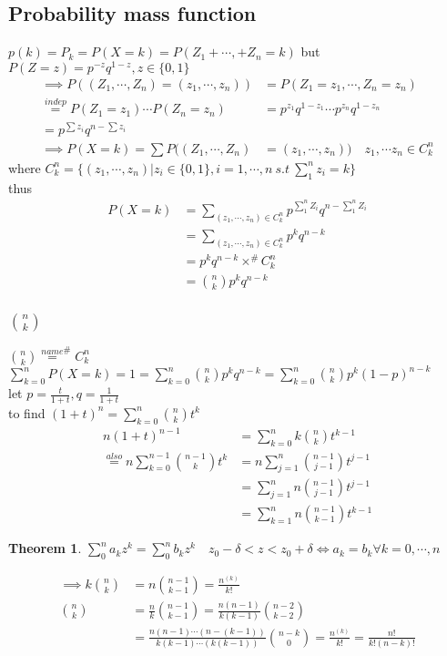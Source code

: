 \documentclass{article}
\theoremstyle{definition}
\theoremstyle{thrm}
\newtheorem{thrm}{Theorem}[section]
\theoremstyle{lma}
\theoremstyle{ppst}
\theoremstyle{crlr}
\begin{document}
\subsection{Probability mass function}
$ p(k) = P_k = P(X=k) = P(Z_1+\cdots,+Z_n=k)$ but $P(Z=z) = p^{-z}q^{1-z}, z\in \{0,1\}$
\begin{align*}
	\implies P((Z_1,\cdots,Z_n)=(z_1,\cdots,z_n)) &= P(Z_1=z_1,\cdots,Z_n=z_n)\\
	\stackrel{indep}{=}P(Z_1=z_1)\cdots P(Z_n=z_n) &= p^{z_1}q^{1-z_1}\cdots p^{z_n}q^{1-z_n}\\
	=p^{\sum z_i}q^{n-\sum z_i}\\
	\implies P(X=k) = \sum P((Z_1,\cdots,Z_n)&=(z_1,\cdots,z_n))\quad z_1,\cdots z_n\in C_k^n
\end{align*}
where $C_k^n = \{(z_1,\cdots, z_n)|z_i\in \{0,1\},i=1,\cdots,n\  s.t\ \sum_1^n z_i=k \}$\\
thus
\begin{align*}
	P(X=k) &=\sum_{(z_1,\cdots, z_n)\in C_k^n}p^{\sum_1^nZ_i}q^{n-\sum_1^nZ_i}\\
	&= \sum_{(z_1,\cdots, z_n)\in C_k^n} p^k q^{n-k}\\
	&= p^k q^{n-k}\times ^{\#}C_k^n\\
	&= {n \choose k}p^kq^{n-k}
\end{align*}
\subsubsection{$n\choose k$}
${n\choose k} \stackrel{name}{=}^{\#}C_k^n $\\
$\sum_{k=0}^nP(X=k)=1=\sum_{k=0}^n {n\choose k}p^kq^{n-k} =\sum_{k=0}^n {n\choose k}p^k(1-p)^{n-k}$\\
let $p = \frac{t}{1+t}, q=\frac{1}{1+t}$\\
to find $(1+t)^n = \sum_{k=0}^n{n\choose k}t^k$
\begin{align*}
	n(1+t)^{n-1} &= \sum_{k=0}^n	k{n \choose k}t^{k-1}\\
	\stackrel{also}{=}n\sum_{k=0}^{n-1}{n-1\choose k}t^k &=n\sum_{j=1}^n{n-1\choose j-1}t^{j-1}\\
	&= \sum_{j=1}^n n{n-1 \choose j-1} t^{j-1}\\
	&= \sum_{k=1}^n n{n-1\choose k-1} t^{k-1}
\end{align*}
\begin{thrm}
	$\sum_0^na_kz^k = \sum_0^nb_kz^k \quad z_0-\delta <z <z_0+\delta \iff a_k=b_k \forall k = 0,\cdots, n$
\end{thrm}
\begin{align*}
	\implies k{n\choose k} &= n{n-1\choose k-1} = \frac{n^{(k)}}{k!}\\
	{n\choose k} &= \frac{n}{k} {n-1\choose k-1} = \frac{n(n-1)}{k(k-1)} {n-2 \choose k-2}\\
	&= \frac{n(n-1)\cdots(n-(k-1))}{k(k-1)\cdots (k(k-1))}{n-k\choose 0} = \frac{n^{(k)}}{k!} = \frac{n!}{k!(n-k)!}
\end{align*}
\end{document}

